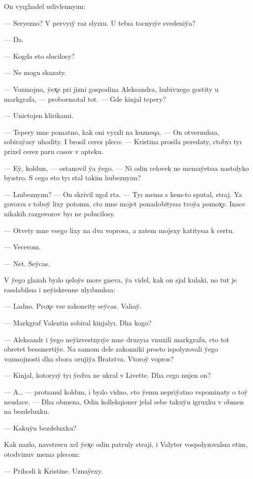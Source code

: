 \documentclass[10pt]{book}
\begin{document}
On vyıglıadel udivlennyım:

— Seryezno? V pervyıy̆ raz slyıxu. U tebıa tocnyıy̆e svedeniy̆a?

— Da.

— Kogda eto slucilosy?

— Ne mogu skazaty.

— Vozmojno, y̆ex̨e pri jizni gospodina Aleksandra, lıubivxego gostity u markgrafa, — probormotal tot. — Gde kinjal tepery?

— Unictojen klirikami.

— Tepery mne ponıatno, kak oni vyıxli na kuzneqa. — On otvernulsıa, sobiray̆asy uhodity. I brosil cerez pleco: — Kristina prosila peredaty, ctobyı tyı prixel cerez paru casov v apteku.

— Ey̆, koldun, — ostanovil y̆a y̆ego. — Ni odin celovek ne menıay̆etsıa nastolyko byıstro. S cego eto tyı stal takim lıubeznyım?

— Lıubeznyım? — On skrivil ugol rta. — Tyı menıa s kem-to sputal, straj. Ya govorıu s toboy̆ lixy potomu, cto mne mojet ponadobitysıa tvoy̆a pomox̨y. Inace nikakih razgovorov byı ne polucilosy.

— Otvety mne vsego lixy na dva voprosa, a zatem mojexy katitysıa k certu.

— Vecerom.

— Net. Sey̆cas.

V y̆ego glazah byılo qeloy̆e more gneva, y̆a videl, kak on sjal kulaki, no tut je rasslabilsıa i ney̆iskrenne ulyıbnulsıa:

— Ladno. Prox̨e vse zakoncity sey̆cas. Valıay̆.

— Markgraf Valentin sobiral kinjalyı. Dlıa kogo?

— Aleksandr i y̆ego ney̆izvestnyıy̆e mne druzyıa vnuxili markgrafu, cto tot obretet bessmertiy̆e. Na samom dele zakonniki prosto ispolyzovali y̆ego vozmojnosti dlıa sbora orujiy̆a Bratstva. Vtoroy̆ vopros?

— Kinjal, kotoryıy̆ tyı y̆edva ne ukral v Livette. Dlıa cego nujen on?

— A… — protıanul koldun, i byılo vidno, cto y̆emu nepriy̆atno vspominaty o toy̆ neudace. — Dlıa obmena. Odin kollekqioner jelal sebe takuy̆u igruxku v obmen na bezdeluxku.

— Kakuy̆u bezdeluxku?

Kak nazlo, navstrecu xel y̆ex̨e odin patruly straji, i Valyter vospolyzovalsıa etim, otodvinuv menıa plecom:

— Prihodi k Kristine. Uznay̆exy.
\end{document}
